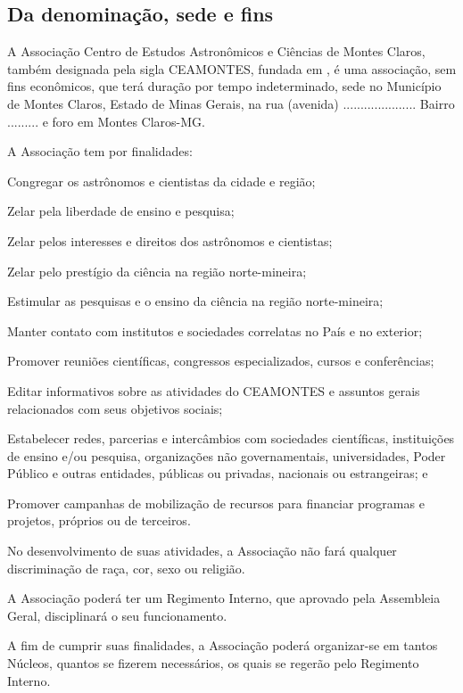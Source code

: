 \documentclass{estatuto}
\begin{document}

	\begin{artigos}
		\section{Da denominação, sede e fins}
			\item A Associação Centro de Estudos Astronômicos e Ciências de Montes Claros, também designada pela sigla CEAMONTES, fundada em , é uma associação, sem fins econômicos, que terá duração por tempo indeterminado, sede no Município de Montes Claros, Estado de Minas Gerais, na rua (avenida) ..................... Bairro ......... e foro em Montes Claros-MG.
			\item A Associação tem por finalidades:
				\begin{itens}
					\item Congregar os astrônomos e cientistas da cidade e região;
					\item Zelar pela liberdade de ensino e pesquisa;
					\item Zelar pelos interesses e direitos dos astrônomos e cientistas;
					\item Zelar pelo prestígio da ciência na região norte-mineira;
					\item Estimular as pesquisas e o ensino da ciência na região norte-mineira;
					\item Manter contato com institutos e sociedades correlatas no País e no exterior;
					\item Promover reuniões científicas, congressos especializados, cursos e conferências;
					\item Editar informativos sobre as atividades do CEAMONTES e assuntos gerais relacionados com seus objetivos sociais;
					\item Estabelecer redes, parcerias e intercâmbios com sociedades científicas, instituições de ensino e/ou pesquisa, organizações não governamentais, universidades, Poder Público e outras entidades, públicas ou privadas, nacionais ou estrangeiras; e
					\item Promover campanhas de mobilização de recursos para financiar programas e projetos, próprios ou de terceiros.
				\end{itens}
			\item No desenvolvimento de suas atividades, a Associação não fará qualquer discriminação de raça, cor, sexo ou religião.
			\item A Associação poderá ter um Regimento Interno, que aprovado pela Assembleia Geral, disciplinará o seu funcionamento.
			\item A fim de cumprir suas finalidades, a Associação poderá organizar-se em tantos Núcleos, quantos se fizerem necessários, os quais se regerão pelo Regimento Interno.
			

\end{artigos}
\end{document}
